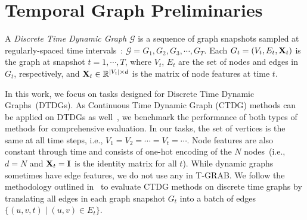\section{Temporal Graph Preliminaries}

\begin{definition} 
A \emph{Discrete Time Dynamic Graph} $\mathcal{G}$ is a sequence of graph snapshots sampled at regularly-spaced time intervals~\cite{kazemi2020representation}:
$ \mathcal G = G_1,G_2,G_3,\cdots,G_T.$
Each $G_t = (V_t, E_t, \mathbf{X}_t)$ is the graph at snapshot $t=1,\cdots, T$, where ${V}_t$, ${E}_t$ are the set of nodes and edges in ${G}_t$, respectively, and $\mathbf{X}_t\in \mathbb R^{|V_t| \times d}$ is the matrix of node features at time $t$.
\end{definition}

In this work, we focus on tasks designed for Discrete Time Dynamic Graphs~(DTDGs). As Continuous Time Dynamic Graph (CTDG) methods can be applied on DTDGs as well~\cite{huangutg}, we benchmark the performance of both types of methods for comprehensive evaluation.
In our tasks, the set of vertices is the same at all time steps, i.e., $V_1=V_2=\cdots =V_t = \cdots$. Node features are also constant through time and consists of one-hot encoding of the $N$ nodes~(i.e., $d=N$ and $\mathbf{X}_t = \mathbf{I}$ is the identity matrix for all $t$). While dynamic graphs sometimes have edge features, we do not use any in T-GRAB. We follow the methodology outlined in~\cite{huangutg} to evaluate CTDG methods on discrete time graphs by translating all edges in each graph snapshot $G_t$ into a batch of edges $\{(u,v,t) \mid (u,v)\in E_t\}$. 
